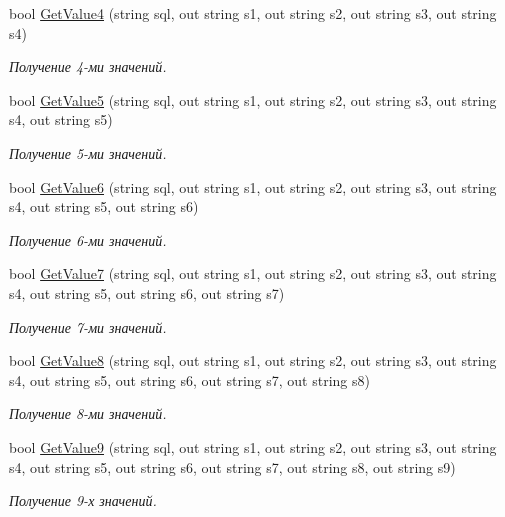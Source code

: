 \begin{DoxyCompactItemize}
bool \mbox{\hyperlink{class_f_b_a_1_1_connection_a99f3a0c81f814bb49d075ea382e51b71}{Get\+Value4}} (string sql, out string s1, out string s2, out string s3, out string s4)
\begin{DoxyCompactList}\small\item\em Получение 4-\/ми значений. \end{DoxyCompactList}\item 
bool \mbox{\hyperlink{class_f_b_a_1_1_connection_ab11d0b86feaf69fbb49846f4537145ce}{Get\+Value5}} (string sql, out string s1, out string s2, out string s3, out string s4, out string s5)
\begin{DoxyCompactList}\small\item\em Получение 5-\/ми значений. \end{DoxyCompactList}\item 
bool \mbox{\hyperlink{class_f_b_a_1_1_connection_a50231c21a05c72ecab89a5b347941462}{Get\+Value6}} (string sql, out string s1, out string s2, out string s3, out string s4, out string s5, out string s6)
\begin{DoxyCompactList}\small\item\em Получение 6-\/ми значений. \end{DoxyCompactList}\item 
bool \mbox{\hyperlink{class_f_b_a_1_1_connection_a220dc571237011f2e0afddd935cacd6d}{Get\+Value7}} (string sql, out string s1, out string s2, out string s3, out string s4, out string s5, out string s6, out string s7)
\begin{DoxyCompactList}\small\item\em Получение 7-\/ми значений. \end{DoxyCompactList}\item 
bool \mbox{\hyperlink{class_f_b_a_1_1_connection_a79f620faffaf2bc26837bfe8d4ef368b}{Get\+Value8}} (string sql, out string s1, out string s2, out string s3, out string s4, out string s5, out string s6, out string s7, out string s8)
\begin{DoxyCompactList}\small\item\em Получение 8-\/ми значений. \end{DoxyCompactList}\item 
bool \mbox{\hyperlink{class_f_b_a_1_1_connection_a963bce9db48309a24f9e5360255f7f5e}{Get\+Value9}} (string sql, out string s1, out string s2, out string s3, out string s4, out string s5, out string s6, out string s7, out string s8, out string s9)
\begin{DoxyCompactList}\small\item\em Получение 9-\/х значений. \end{DoxyCompactList}\item 

\end{DoxyCompactItemize}
